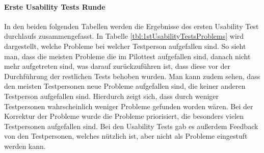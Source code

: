 \paragraph{Erste Usability Tests Runde}

In den beiden folgenden Tabellen werden die Ergebnisse des ersten Usability Test durchlaufs zusammengefasst. In Tabelle \ref{tbl:1stUsabilityTestsProblems} wird dargestellt, welche Probleme bei welcher Testperson aufgefallen sind. So sieht man, dass die meisten Probleme die im Pilottest aufgefallen sind, danach nicht mehr aufgetreten sind, was darauf zurückzuführen ist, dass diese vor der Durchführung der restlichen Tests behoben wurden. Man kann zudem sehen, dass den meisten Testpersonen neue Probleme aufgefallen sind, die keiner anderen Testperson aufgefallen sind. Hierdurch zeigt sich, dass durch weniger Testpersonen wahrscheinlich weniger Probleme gefunden worden wären. Bei der Korrektur der Probleme wurde die Probleme priorisiert, die besonders vielen Testpersonen aufgefallen sind. Bei den Usability Tests gab es außerdem Feedback von den Testpersonen, welches nützlich ist, aber nicht als Probleme eingestuft werden kann.

